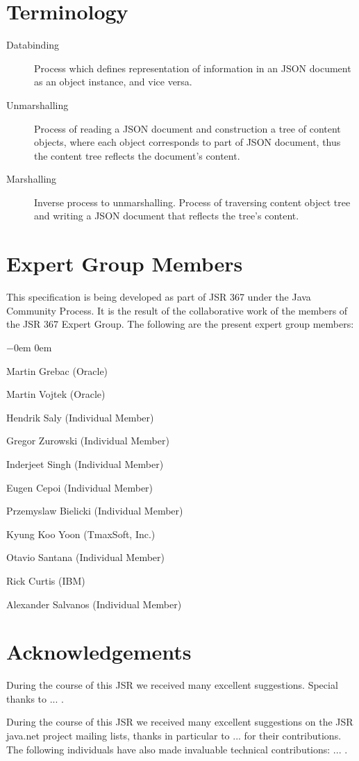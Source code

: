 \section{Terminology}
\label{terminology}

\begin{description}
\item[Databinding] Process which defines representation of information in an JSON document as an object instance, and vice versa.
\item[Unmarshalling] Process of reading a JSON document and construction a tree of content objects, 
where each object corresponds to part of JSON document, thus the content tree reflects the document's content.
\item[Marshalling] Inverse process to unmarshalling. Process of traversing content object tree and writing a JSON document that reflects the tree's content.

\end{description}

\section{Expert Group Members} 
\label{expert_group}

This specification is being developed as part of JSR 367 under the Java Community Process. 
It is the result of the collaborative work of the members of the JSR 367 Expert Group. 
The following are the present expert group members:

\begin{list}{$-$}{\parsep 0em  0em}
\item Martin Grebac (Oracle)
\item Martin Vojtek (Oracle)
\item Hendrik Saly (Individual Member)
\item Gregor Zurowski (Individual Member) 
\item Inderjeet Singh (Individual Member)
\item Eugen Cepoi (Individual Member)
\item Przemyslaw Bielicki (Individual Member)
\item Kyung Koo Yoon (TmaxSoft, Inc.)
\item Otavio Santana (Individual Member)
\item Rick Curtis (IBM)
\item Alexander Salvanos (Individual Member)
\end{list}

\section{Acknowledgements}
\label{acks}

During the course of this JSR we received many excellent suggestions. Special thanks to ... .

During the course of this JSR we received many excellent suggestions on the JSR java.net project mailing lists, thanks in particular to ...  for their contributions. The following individuals have also made invaluable technical contributions: ... .
